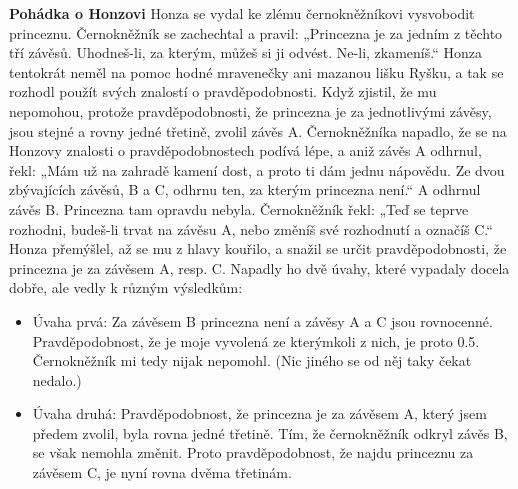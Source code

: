 \begin{mdframed}[style=mdexam]
  \begin{example}\label{mai:exam062}
    \textbf{Pohádka o Honzovi}\newline
    Honza se vydal ke zlému černokněžníkovi vysvobodit princeznu. Černokněžník se zachechtal a
    pravil: „Princezna je za jedním z těchto tří závěsů. Uhodneš-li, za kterým, můžeš si ji odvést.
    Ne-li, zkameníš.“ Honza tentokrát neměl na pomoc hodné mravenečky ani mazanou lišku Ryšku, a tak
    se rozhodl použít svých znalostí o pravděpodobnosti. Když zjistil, že mu nepomohou, protože
    pravděpodobnosti, že princezna je za jednotlivými závěsy, jsou stejné a rovny jedné třetině,
    zvolil závěs A. Černokněžníka napadlo, že se na Honzovy znalosti o pravděpodobnostech podívá
    lépe, a aniž závěs A odhrnul, řekl: „Mám už na zahradě kamení dost, a proto ti dám jednu
    nápovědu. Ze dvou zbývajících závěsů, B a C, odhrnu ten, za kterým princezna není.“ A odhrnul
    závěs B. Princezna tam opravdu nebyla. Černokněžník řekl: „Teď se teprve rozhodni, budeš-li
    trvat na závěsu A, nebo změníš své rozhodnutí a označíš C.“ Honza přemýšlel, až se mu z hlavy
    kouřilo, a snažil se určit pravděpodobnosti, že princezna je za závěsem A, resp. C. Napadly ho
    dvě úvahy, které vypadaly docela dobře, ale vedly k různým výsledkům:
    \begin{itemize}[noitemsep]
    \item Úvaha prvá: Za závěsem B princezna není a závěsy A a C jsou rovnocenné. Pravděpodobnost,
          že je moje vyvolená ze kterýmkoli z nich, je proto \num{0.5}. Černokněžník mi tedy nijak
          nepomohl. (Nic jiného se od něj taky čekat nedalo.)
    \item Úvaha druhá: Pravděpodobnost, že princezna je za závěsem A, který jsem předem zvolil, byla
          rovna jedné třetině. Tím, že černokněžník odkryl závěs B, se však nemohla změnit. Proto
          pravděpodobnost, že najdu princeznu za závěsem C, je nyní rovna dvěma třetinám.
    \end{itemize}
    

\end{example}
\end{mdframed}
